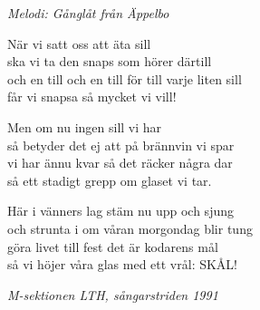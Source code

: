 {\footnotesize\textit{Melodi: Gånglåt från Äppelbo}}\par
\vspace{10pt}
När vi satt oss att äta sill\\
ska vi ta den snaps som hörer därtill\\
och en till och en till för till varje liten sill\\
får vi snapsa så mycket vi vill!\par
\vspace{10pt}
Men om nu ingen sill vi har\\
så betyder det ej att på brännvin vi spar\\
vi har ännu kvar så det räcker några dar\\
så ett stadigt grepp om glaset vi tar.\par
\vspace{10pt}
Här i vänners lag stäm nu upp och sjung\\
och strunta i om våran morgondag blir tung\\
göra livet till fest det är kodarens mål\\
så vi höjer våra glas med ett vrål: SKÅL!
\par
\vspace{10pt}
{\footnotesize\textit{M-sektionen LTH, sångarstriden 1991}}
